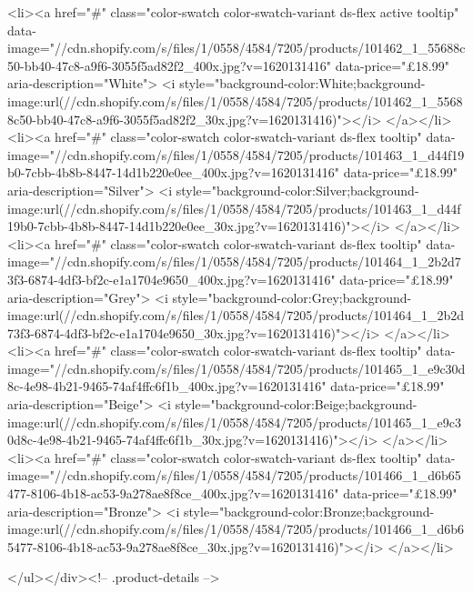 {{{{{{{<li><a href="#" class="color-swatch color-swatch-variant ds-flex active tooltip" data-image="//cdn.shopify.com/s/files/1/0558/4584/7205/products/101462_1_55688c50-bb40-47c8-a9f6-3055f5ad82f2_400x.jpg?v=1620131416" data-price="£18.99" aria-description="White">
              <i style="background-color:White;background-image:url(//cdn.shopify.com/s/files/1/0558/4584/7205/products/101462_1_55688c50-bb40-47c8-a9f6-3055f5ad82f2_30x.jpg?v=1620131416)"></i>
            </a></li>
<li><a href="#" class="color-swatch color-swatch-variant ds-flex tooltip" data-image="//cdn.shopify.com/s/files/1/0558/4584/7205/products/101463_1_d44f19b0-7cbb-4b8b-8447-14d1b220e0ee_400x.jpg?v=1620131416" data-price="£18.99" aria-description="Silver">
              <i style="background-color:Silver;background-image:url(//cdn.shopify.com/s/files/1/0558/4584/7205/products/101463_1_d44f19b0-7cbb-4b8b-8447-14d1b220e0ee_30x.jpg?v=1620131416)"></i>
            </a></li>
<li><a href="#" class="color-swatch color-swatch-variant ds-flex tooltip" data-image="//cdn.shopify.com/s/files/1/0558/4584/7205/products/101464_1_2b2d73f3-6874-4df3-bf2c-e1a1704e9650_400x.jpg?v=1620131416" data-price="£18.99" aria-description="Grey">
              <i style="background-color:Grey;background-image:url(//cdn.shopify.com/s/files/1/0558/4584/7205/products/101464_1_2b2d73f3-6874-4df3-bf2c-e1a1704e9650_30x.jpg?v=1620131416)"></i>
            </a></li>
<li><a href="#" class="color-swatch color-swatch-variant ds-flex tooltip" data-image="//cdn.shopify.com/s/files/1/0558/4584/7205/products/101465_1_e9c30d8c-4e98-4b21-9465-74af4ffc6f1b_400x.jpg?v=1620131416" data-price="£18.99" aria-description="Beige">
              <i style="background-color:Beige;background-image:url(//cdn.shopify.com/s/files/1/0558/4584/7205/products/101465_1_e9c30d8c-4e98-4b21-9465-74af4ffc6f1b_30x.jpg?v=1620131416)"></i>
            </a></li>
<li><a href="#" class="color-swatch color-swatch-variant ds-flex tooltip" data-image="//cdn.shopify.com/s/files/1/0558/4584/7205/products/101466_1_d6b65477-8106-4b18-ac53-9a278ae8f8ce_400x.jpg?v=1620131416" data-price="£18.99" aria-description="Bronze">
              <i style="background-color:Bronze;background-image:url(//cdn.shopify.com/s/files/1/0558/4584/7205/products/101466_1_d6b65477-8106-4b18-ac53-9a278ae8f8ce_30x.jpg?v=1620131416)"></i>
            </a></li>

      </ul></div><!-- .product-details -->

}}}}}}}
